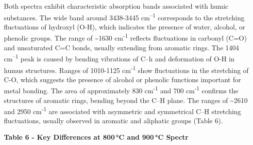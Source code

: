 Both spectra exhibit characteristic absorption bands associated with
humic substances. The wide band around 3438-3445 cm\textsuperscript{--1}
corresponds to the stretching fluctuations of hydroxyl (O-H), which
indicates the presence of water, alcohol, or phenolic groups. The range
of \textasciitilde1630 cm\textsuperscript{-1} reflects fluctuations in
carbonyl (C=O) and unsaturated C=C bonds, usually extending from
aromatic rings. The 1404 cm\textsuperscript{--1} peak is caused by
bending vibrations of C--h and deformation of O-H in humus structures.
Ranges of 1010-1125 cm\textsuperscript{-1} show fluctuations in the
stretching of C-O, which suggests the presence of alcohol or phenolic
functions important for metal bonding. The area of approximately 830
cm\textsuperscript{-1} and 700 cm\textsuperscript{-1} confirms the
structures of aromatic rings, bending beyond the C--H plane. The ranges
of \textasciitilde2610 and 2950 cm\textsuperscript{-1} are associated
with asymmetric and symmetrical C--H stretching fluctuations, usually
observed in aromatic and aliphatic groups (Table 6).

{\bfseries Table 6 - Key Differences at 800\,°C and 900\,°C Spectr}

